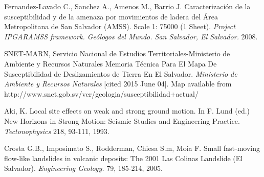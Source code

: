\documentclass[11pt,twoside]{rmta2010eng}%
\begin{document}
\begin{thebibliography}{99}
Fernandez-Lavado C., Sanchez A., Amenos M., Barrio J.
\newblock Caracterizaci\'{o}n de la susceptibilidad y de la amenaza por movimientos de ladera del \'{A}rea Metropolitana de San Salvador (AMSS). Scale 1: 75000 (1 Sheet).
\newblock \emph{Project IPGARAMSS framework. Ge\'{o}logos del Mundo. San Salvador, El Salvador.}
 2008.




SNET-MARN, Servicio Nacional de Estudios Territoriales-Ministerio de Ambiente y Recursos Naturales
\newblock Memoria T\'{e}cnica Para El Mapa De Susceptibilidad de Deslizamientos de Tierra En El Salvador.
\newblock \emph{Ministerio de Ambiente y Recursos Naturales}
 [cited 2015 June 04]. Map available from http://www.snet.gob.sv/ver/geologia/susceptibilidad+actual/


Aki, K. 
\newblock Local site effects on weak and strong ground motion. In F. Lund (ed.) New Horizons in Strong Motion: Seismic Studies and Engineering Practice.
\newblock \emph{Tectonophysics}
 218, 93-111, 1993.   


Crosta G.B., Imposimato S., Rodderman, Chiesa S.m, Moia F. 
\newblock Small fast-moving flow-like landslides in volcanic deposits: The 2001 Las Colinas Landslide (El Salvador). 
\newblock \emph{Engineering Geology.}
 79, 185-214, 2005.




\end{thebibliography}
\end{document}
